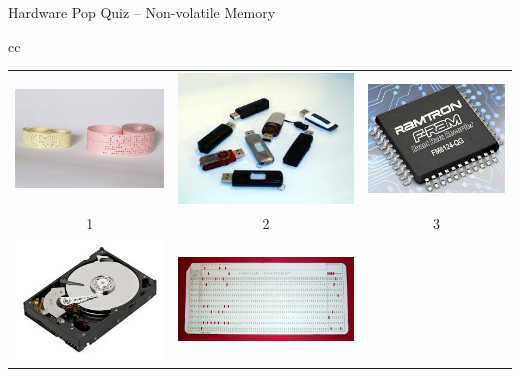 \documentclass[compress,11pt,xcolor=svgnames,aspectratio=169]{beamer}
\begin{document}
\begin{frame}[t]{Hardware Pop Quiz -- Non-volatile Memory}
\begin{center}
\begin{tabular}{cc}
\begin{tabular}{ccc}
\includegraphics[scale=0.15]{fig/paper-tape} &
\includegraphics[scale=0.15]{fig/usb} &
\includegraphics[scale=0.15]{fig/fram} \\
1 & 2 & 3 \\
\includegraphics[scale=0.15]{fig/disk} &
\includegraphics[scale=0.15]{fig/punch-card} &

\end{tabular}
\end{tabular}
\end{center}
\end{frame}
\end{document}
